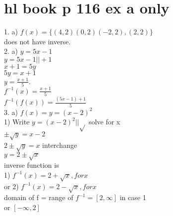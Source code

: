 \documentclass{article}
\begin{document}
  \section{hl book p 116 ex a only }
  1. a) $f(x)=\{(4,2)(0,2)(-2,2),(2,2)\}$\\
  does not have inverse.\\
  2. a) $y=5x-1$\\
  $y=5x-1 || +1$\\
  $x+1=5y$\\
  $5y=x+1$\\
  $y=\frac{x+1}{5}$.\\
  $f^{-1}(x)=\frac{x+1}{5}$\\
  $f^{-1}(f(x))=\frac{(5x-1)+1}{5}$\\
  3. a) $f(x)=y=(x-2)^2$\\
  1) Write $y=(x-2)^2 || \sqrt{}$ solve for x\\
  $\pm\sqrt{y}=x-2$\\
  $2\pm\sqrt{y}=x$ interchange\\
  $y=2\pm\sqrt{x}$\\
  inverse function is\\
  1) $f^{-1}(x)=2+\sqrt{x}, for x$\\
  or 2) $f^{-1}(x)=2-\sqrt{x}, for x$\\
  domain of f = range of $f^{-1}=[2,\infty]$ in case 1\\
  or $[-\infty, 2]$
  
  
   
\end{document}
